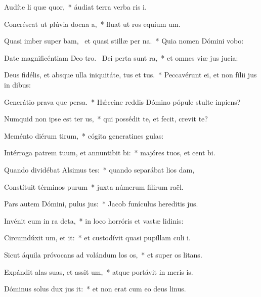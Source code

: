 \item Audíte li quæ quor,~* áudiat terra verba ris i.
\item Concréscat ut plúvia docna a,~* fluat ut ros equium um.
\item Quasi imber super bam,~\pscross{} et quasi stillæ per na.~* Quia nomen Dómini vobo:
\item Date magnificéntiam Deo tro.~\pscross{} Dei perta sunt ra,~* et omnes viæ jus jucia:
\item Deus fidélis, et absque ulla iniquitáte, tus et tus.~* Peccavérunt ei, et non fílii jus in dibus:
\item Generátio prava que persa.~* Hǽccine reddis Dómino pópule stulte  inpiens?
\item Numquid non ipse est ter us,~* qui possédit te, et fecit,  crevit te?
\item Meménto diérum tirum,~* cógita generatines gulas:
\item Intérroga patrem tuum, et annuntibit bi:~* majóres tuos, et cent bi.
\item Quando dividébat Alsimus tes:~* quando separábat lios dam,
\item Constítuit términos purum~* juxta númerum filirum raël.
\item Pars autem Dómini, pulus jus:~* Jacob funículus hereditis jus.
\item Invénit eum in ra deta,~* in loco horróris et vastæ lidinis:
\item Circumdúxit um, et it:~* et custodívit quasi pupíllam culi i.
\item Sicut áquila próvocans ad volándum los os,~* et super os litans.
\item Expándit alas suas, et assit um,~* atque portávit in meris is.
\item Dóminus solus dux jus it:~* et non erat cum eo deus linus.
